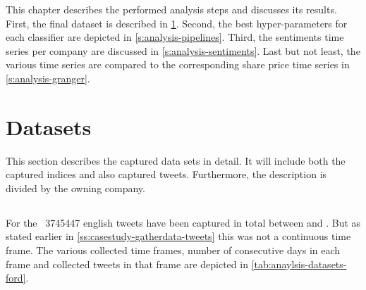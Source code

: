 


\newcommand{\indicesCaption}[1]{Indices of #1 within the evaluation time frame}
\newcommand{\resultsCaption}[1]{Normalized sentiment and share values of #1 within the evaluation time frame}
\newcommand{\sentimentsCaption}[1]{Summarized and normalized sentiment values of #1 within the evaluation time frame}
\newcommand{\tweetsCaption}[1]{Collection time frames of tweets for #1}
\newcommand{\confusionCaption}[1]{Confusion matrix of classifier #1}
\newcommand{\hyperCaption}[1]{Determined hyper-parameters for pipeline of classifier #1}
\newcommand{\oppositeCaption}[1]{Days with opposite sentiment values for the company #1}

This chapter describes the performed analysis steps and discusses its results.
First, the final dataset is described in \cref{s:analysis-datasets}.
Second, the best hyper-parameters for each classifier are depicted in \cref{s:analysis-pipelines}.
Third, the sentiments time series per company are discussed in \cref{s:analysis-sentiments}.
Last but not least, the various time series are compared to the corresponding share price time series in \cref{s:analysis-granger}.

\section{Datasets}
\label{s:analysis-datasets}

This section describes the captured data sets in detail.
It will include both the captured indices and also captured tweets.
Furthermore, the description is divided by the owning company.

\subsection{\ford}
\label{ss:analysis-datasets-ford}


For the \ford\ \num{3745447} english tweets have been captured in total between  and .
But as stated earlier in \cref{ss:casestudy-gatherdata-tweets} this was not a continuous time frame.
The various collected time frames, number of consecutive days in each frame and collected tweets in that frame are depicted in \cref{tab:anaylsis-datasets-ford}.

